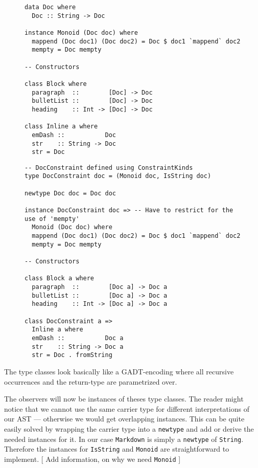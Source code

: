 \documentclass[format=acmsmall, review=true, screen=true]{acmart}
\begin{document}
\begin{figure}
\begin{lstlisting}
data Doc where
  Doc :: String -> Doc

instance Monoid (Doc doc) where
  mappend (Doc doc1) (Doc doc2) = Doc $ doc1 `mappend` doc2
  mempty = Doc mempty

-- Constructors

class Block where
  paragraph  ::        [Doc] -> Doc
  bulletList ::        [Doc] -> Doc
  heading    :: Int -> [Doc] -> Doc

class Inline a where
  emDash ::           Doc
  str    :: String -> Doc
  str = Doc
\end{lstlisting}
\end{figure}

\begin{figure}
\begin{lstlisting}
-- DocConstraint defined using ConstraintKinds
type DocConstraint doc = (Monoid doc, IsString doc)

newtype Doc doc = Doc doc

instance DocConstraint doc => -- Have to restrict for the use of 'mempty'
  Monoid (Doc doc) where
  mappend (Doc doc1) (Doc doc2) = Doc $ doc1 `mappend` doc2
  mempty = Doc mempty

-- Constructors

class Block a where
  paragraph  ::        [Doc a] -> Doc a
  bulletList ::        [Doc a] -> Doc a
  heading    :: Int -> [Doc a] -> Doc a

class DocConstraint a =>
  Inline a where
  emDash ::           Doc a
  str    :: String -> Doc a
  str = Doc . fromString
\end{lstlisting}
\end{figure}

The type classes look basically like a GADT-encoding where all recursive
occurrences and the return-type are parametrized over.

The observers will now be instances of theses type classes. The reader might
notice that we cannot use the same carrier type for different interpretations of
our AST — otherwise we would get overlapping instances. This can be quite easily
solved by wrapping the carrier type into a \texttt{newtype} and add or derive the
needed instances for it. In our case \texttt{Markdown} is simply a \texttt{newtype} of
\texttt{String}. Therefore the instances for \texttt{IsString} and \texttt{Monoid} are
straightforward to implement. [ Add information, on why we need \texttt{Monoid} ]
\end{document}
